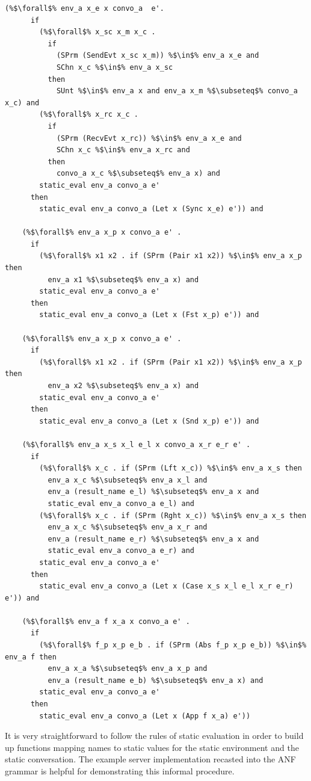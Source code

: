 \documentclass{article}
\begin{document}
\begin{lstlisting}[language=logic, escapechar=\%]
    (%$\forall$% env_a x_e x convo_a  e'.
      if
        (%$\forall$% x_sc x_m x_c . 
          if
            (SPrm (SendEvt x_sc x_m)) %$\in$% env_a x_e and 
            SChn x_c %$\in$% env_a x_sc 
          then
            SUnt %$\in$% env_a x and env_a x_m %$\subseteq$% convo_a x_c) and
        (%$\forall$% x_rc x_c . 
          if
            (SPrm (RecvEvt x_rc)) %$\in$% env_a x_e and 
            SChn x_c %$\in$% env_a x_rc and 
          then
            convo_a x_c %$\subseteq$% env_a x) and
        static_eval env_a convo_a e'
      then
        static_eval env_a convo_a (Let x (Sync x_e) e')) and

    (%$\forall$% env_a x_p x convo_a e' . 
      if
        (%$\forall$% x1 x2 . if (SPrm (Pair x1 x2)) %$\in$% env_a x_p then
          env_a x1 %$\subseteq$% env_a x) and
        static_eval env_a convo_a e'
      then
        static_eval env_a convo_a (Let x (Fst x_p) e')) and

    (%$\forall$% env_a x_p x convo_a e' . 
      if
        (%$\forall$% x1 x2 . if (SPrm (Pair x1 x2)) %$\in$% env_a x_p then
          env_a x2 %$\subseteq$% env_a x) and
        static_eval env_a convo_a e'
      then
        static_eval env_a convo_a (Let x (Snd x_p) e')) and

    (%$\forall$% env_a x_s x_l e_l x convo_a x_r e_r e' . 
      if
        (%$\forall$% x_c . if (SPrm (Lft x_c)) %$\in$% env_a x_s then 
          env_a x_c %$\subseteq$% env_a x_l and
          env_a (result_name e_l) %$\subseteq$% env_a x and
          static_eval env_a convo_a e_l) and
        (%$\forall$% x_c . if (SPrm (Rght x_c)) %$\in$% env_a x_s then 
          env_a x_c %$\subseteq$% env_a x_r and
          env_a (result_name e_r) %$\subseteq$% env_a x and
          static_eval env_a convo_a e_r) and
        static_eval env_a convo_a e'
      then
        static_eval env_a convo_a (Let x (Case x_s x_l e_l x_r e_r) e')) and

    (%$\forall$% env_a f x_a x convo_a e' . 
      if
        (%$\forall$% f_p x_p e_b . if (SPrm (Abs f_p x_p e_b)) %$\in$% env_a f then 
          env_a x_a %$\subseteq$% env_a x_p and 
          env_a (result_name e_b) %$\subseteq$% env_a x) and
        static_eval env_a convo_a e'
      then
        static_eval env_a convo_a (Let x (App f x_a) e'))
  \end{lstlisting}

It is very straightforward to follow the rules of static evaluation in order to build up
functions mapping names to static values for the static environment and the static conversation.
The example server implementation recasted into the ANF grammar is helpful for demonstrating this
informal procedure.
\end{document}
